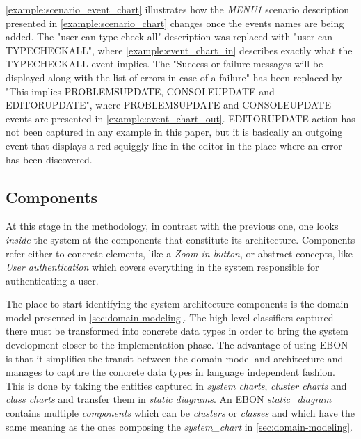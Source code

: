 \documentclass[conference]{IEEEtran}
\begin{document}
\autoref{example:scenario_event_chart} illustrates how the
\emph{MENU1} scenario description presented in
\autoref{example:scenario_chart} changes once the events names are
being added. The "user can type check all" description was
replaced with "user can TYPECHECKALL", where
\autoref{example:event_chart_in} describes exactly what the
TYPECHECKALL event implies. The "Success or failure messages will
be displayed along with the list of errors in case of a failure" has
been replaced by "This implies PROBLEMSUPDATE, CONSOLEUPDATE and
EDITORUPDATE", where PROBLEMSUPDATE and CONSOLEUPDATE events are
presented in \autoref{example:event_chart_out}. EDITORUPDATE action
has not been captured in any example in this paper, but it is
basically an outgoing event that displays a red squiggly line in the editor
in the place where an error has been discovered.


%
\subsection{Components}
\label{sec:components}

At this stage in the methodology, in contrast with the previous one,
one looks \emph{inside} the system at the components that constitute
its architecture.  Components refer either to concrete elements, like a
\emph{Zoom in button}, or abstract concepts, like \emph{User
  authentication} which covers everything in the system responsible
for authenticating a user.

The place to start identifying the system architecture components is
the domain model presented in \autoref{sec:domain-modeling}. The high
level classifiers captured there must be transformed into concrete
data types in order to bring the system development closer to the
implementation phase. The advantage of using EBON is that it
simplifies the transit between the domain model and architecture
and manages to capture the concrete data types in language
independent fashion. This is done by taking the entities captured in
\emph{system charts}, \emph{cluster charts} and \emph{class charts} and
transfer them in \emph{static diagrams}. An EBON \emph{static\_diagram}
contains multiple \emph{components} which can be \emph{clusters} or
\emph{classes} and which have the same meaning as the ones composing the
\emph{system\_chart} in \autoref{sec:domain-modeling}.


\end{document}
